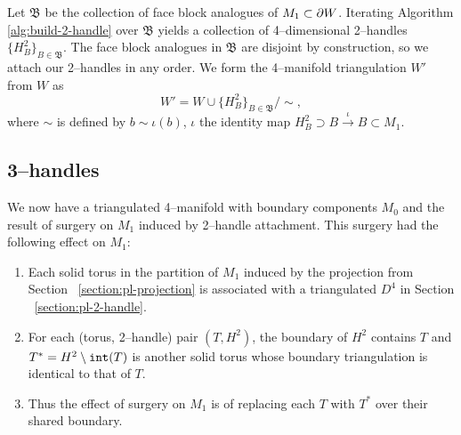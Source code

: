 Let $\mathfrak{B}$ be the collection of face block analogues of $M_1\subset \partial W$.
Iterating Algorithm \ref{alg:build-2-handle} over $\mathfrak{B}$ yields a collection of 4--dimensional 2--handles $\{H_B^2\}_{B\in\mathfrak{B}}$.
The face block analogues in $\mathfrak{B}$ are disjoint by construction, so we attach our 2--handles in any order.
We form the 4--manifold triangulation $W'$ from $W$ as
\[
	W' = W\cup\{H_B^2\}_{B\in\mathfrak{B}}/\sim,
\]
where $\sim$ is defined by $b\sim \iota(b)$, $\iota$ the identity map $H_B^2\supset B\overset{\iota}{\to} B\subset M_1$.


%	


\subsection{3--handles}

We now have a triangulated 4--manifold with boundary components $M_0$ and the result of surgery on $M_1$ induced by 2--handle attachment.
This surgery had the following effect on $M_1$:
\begin{enumerate}
	\item Each solid torus in the partition of $M_1$ induced by the projection from Section ~\ref{section:pl-projection} is associated with a triangulated $D^4$ in Section ~\ref{section:pl-2-handle}.
	\item For each (torus, 2--handle) pair $(T, H^2)$, the boundary of $H^2$ contains $T$ and $T^* = H^2\setminus \texttt{int}(T)$ is another solid torus whose boundary triangulation is identical to that of $T$.
	\item Thus the effect of surgery on $M_1$ is of replacing each $T$ with $T^*$ over their shared boundary.
\end{enumerate}

